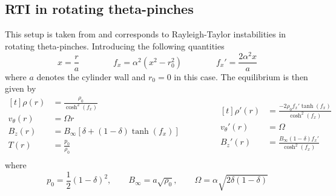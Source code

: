 \documentclass[12pt]{article}
\begin{document}
\subsection{RTI in rotating theta-pinches}
This setup is taken from \citet{goedbloed2018} and corresponds to Rayleigh-Taylor instabilities in rotating theta-pinches.
Introducing the following quantities
\[ x = \frac{r}{a} \qquad\qquad f_x = \alpha^2\left(x^2 - r_0^2\right) \qquad\qquad f_x' = \frac{2\alpha^2 x}{a} \]
where $a$ denotes the cylinder wall and $r_0 = 0$ in this case.
The equilibrium is then given by
\begin{equation*}
	\begin{aligned}[t]
		\rho(r) &= \frac{\rho_0}{\cosh^2(f_x)} \\
		v_\theta(r) &= \Omega r \\
		B_z(r) &= B_\infty\left[\delta + \left(1 - \delta\right)\tanh(f_x)\right] \\
		T(r) &= \frac{p_0}{\rho_0} \\
	\end{aligned}
	\qquad\qquad
	\begin{aligned}[t]
		\rho'(r) &= \frac{-2\rho_0 f_x' \tanh(f_x)}{\cosh^2(f_x)} \\
		v_\theta'(r) &= \Omega \\
		B_z'(r) &= \frac{B_\infty\left(1 - \delta\right)f_x'}{\cosh^2(f_x)}
	\end{aligned}
\end{equation*}
where
\[ p_0 = \frac{1}{2}\left(1 - \delta\right)^2, \qquad B_\infty = a\sqrt{\rho_0}, \qquad \Omega = \alpha \sqrt{2\delta(1 - \delta)}\]
\end{document}
